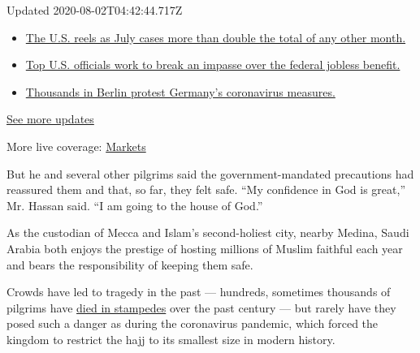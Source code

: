 Updated 2020-08-02T04:42:44.717Z

\begin{itemize}
\tightlist
\item
  \href{https://www.nytimes.com/2020/08/01/world/coronavirus-covid-19.html?action=click\&pgtype=Article\&state=default\&region=MAIN_CONTENT_1\&context=storylines_live_updates\#link-34047410}{The
  U.S. reels as July cases more than double the total of any other
  month.}
\item
  \href{https://www.nytimes.com/2020/08/01/world/coronavirus-covid-19.html?action=click\&pgtype=Article\&state=default\&region=MAIN_CONTENT_1\&context=storylines_live_updates\#link-780ec966}{Top
  U.S. officials work to break an impasse over the federal jobless
  benefit.}
\item
  \href{https://www.nytimes.com/2020/08/01/world/coronavirus-covid-19.html?action=click\&pgtype=Article\&state=default\&region=MAIN_CONTENT_1\&context=storylines_live_updates\#link-25930521}{Thousands
  in Berlin protest Germany's coronavirus measures.}
\end{itemize}

\href{https://www.nytimes.com/2020/08/01/world/coronavirus-covid-19.html?action=click\&pgtype=Article\&state=default\&region=MAIN_CONTENT_1\&context=storylines_live_updates}{See
more updates}

More live coverage:
\href{https://www.nytimes.com/live/2020/07/31/business/stock-market-today-coronavirus?action=click\&pgtype=Article\&state=default\&region=MAIN_CONTENT_1\&context=storylines_live_updates}{Markets}

But he and several other pilgrims said the government-mandated
precautions had reassured them and that, so far, they felt safe. ``My
confidence in God is great,'' Mr. Hassan said. ``I am going to the house
of God.''

As the custodian of Mecca and Islam's second-holiest city, nearby
Medina, Saudi Arabia both enjoys the prestige of hosting millions of
Muslim faithful each year and bears the responsibility of keeping them
safe.

Crowds have led to tragedy in the past --- hundreds, sometimes thousands
of pilgrims have
\href{https://www.nytimes.com/interactive/2016/09/06/world/middleeast/2015-hajj-stampede.html?action=click\&module=RelatedLinks\&pgtype=Article}{died
in stampedes} over the past century --- but rarely have they posed such
a danger as during the coronavirus pandemic, which forced the kingdom to
restrict the hajj to its smallest size in modern history.

